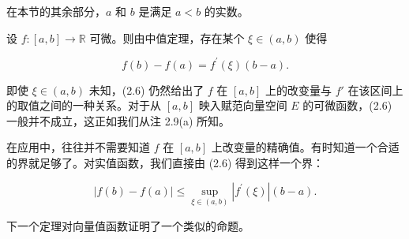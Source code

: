 在本节的其余部分，$a$ 和 $b$ 是满足 $a < b$ 的实数。

设 $ f: [a, b] \to \mathbb{R} $ 可微。则由中值定理，存在某个 $ \xi \in (a, b) $ 使得

\[
f(b)-f(a)=f^{\prime}(\xi)(b-a).
\]

即使 $\xi \in (a, b)$ 未知，(2.6) 仍然给出了 $f$ 在 $[a, b]$ 上的改变量与 $f'$ 在该区间上的取值之间的一种关系。对于从 $[a, b]$ 映入赋范向量空间 $E$ 的可微函数，(2.6) 一般并不成立，这正如我们从注 2.9(a) 所知。

在应用中，往往并不需要知道 $f$ 在 $[a, b]$ 上改变量的精确值。有时知道一个合适的界就足够了。对实值函数，我们直接由 (2.6) 得到这样一个界：

\begin{equation}
\left|f(b)-f(a)\right|\leq\sup_{\xi\in(a,b)}\left|f^{\prime}(\xi)\right|(b-a).
\end{equation}

下一个定理对向量值函数证明了一个类似的命题。

